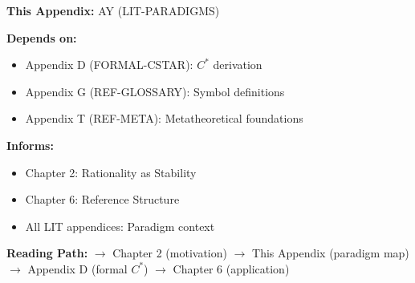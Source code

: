 \begin{tcolorbox}[colback=gray!10!white, colframe=gray!75!black,
    title=\textbf{Cross-Reference Footer}]

\textbf{This Appendix:} AY (LIT-PARADIGMS)

\textbf{Depends on:}
\begin{itemize}[nosep]
    \item Appendix D (FORMAL-CSTAR): $C^*$ derivation
    \item Appendix G (REF-GLOSSARY): Symbol definitions
    \item Appendix T (REF-META): Metatheoretical foundations
\end{itemize}

\textbf{Informs:}
\begin{itemize}[nosep]
    \item Chapter 2: Rationality as Stability
    \item Chapter 6: Reference Structure
    \item All LIT appendices: Paradigm context
\end{itemize}

\textbf{Reading Path:}
$\rightarrow$ Chapter 2 (motivation) $\rightarrow$ This Appendix (paradigm map)
$\rightarrow$ Appendix D (formal $C^*$) $\rightarrow$ Chapter 6 (application)

\end{tcolorbox}


